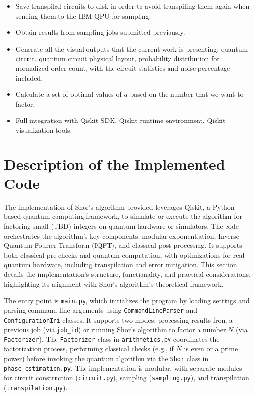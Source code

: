\documentclass[conference,twoside]{IEEEtran}
\begin{document}
\begin{itemize}
    \item Save transpiled circuits to disk in order to avoid transpiling them again when sending them to the IBM QPU for sampling.
    \item Obtain results from sampling jobs submitted previously.
    \item Generate all the visual outputs that the current work is presenting: quantum circuit, quantum circuit physical layout, probability distribution for normalized order count, with the circuit statistics and noise percentage included.
    \item Calculate a set of optimal values of $a$ based on the number that we want to factor.
    \item Full integration with Qiskit SDK, Qiskit runtime environment, Qiskit visualization tools.
\end{itemize}


\section{Description of the Implemented Code}
The implementation of Shor's algorithm provided leverages Qiskit, a Python-based quantum computing framework, to simulate or execute the algorithm for factoring small (TBD) integers on quantum hardware or simulators. The  code orchestrates the algorithm’s key components: modular exponentiation, Inverse Quantum Fourier Transform (IQFT), and classical post-processing. It supports both classical pre-checks and quantum computation, with optimizations for real quantum hardware, including transpilation and error mitigation. This section details the implementation’s structure, functionality, and practical considerations, highlighting its alignment with Shor's algorithm’s theoretical framework.

The entry point is \texttt{main.py}, which initializes the program by loading settings and parsing command-line arguments using \texttt{CommandLineParser} and \texttt{ConfigurationIni} classes. It supports two modes: processing results from a previous job (via \texttt{job\_id}) or running Shor's algorithm to factor a number \( N \) (via \texttt{Factorizer}). The \texttt{Factorizer} class in \texttt{arithmetics.py} coordinates the factorization process, performing classical checks (e.g., if \( N \) is even or a prime power) before invoking the quantum algorithm via the \texttt{Shor} class in \texttt{phase\_estimation.py}. The implementation is modular, with separate modules for circuit construction (\texttt{circuit.py}), sampling (\texttt{sampling.py}), and transpilation (\texttt{transpilation.py}).
\end{document}
